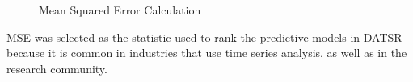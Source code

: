 \documentclass[letterpaper,10pt,english,openany,oneside]{sphinxmanual}
\begin{document}
\begin{figure}[htbp]
\centering
\capstart

\noindent{}
\caption{Mean Squared Error Calculation}\label{\detokenize{scoring:id2}}\end{figure}

\sphinxAtStartPar
MSE was selected as the statistic used to rank the predictive models in DATSR because it is common in industries that use time series analysis, as well as in the research community.



\renewcommand{\indexname}{Index}
\printindex
\end{document}
